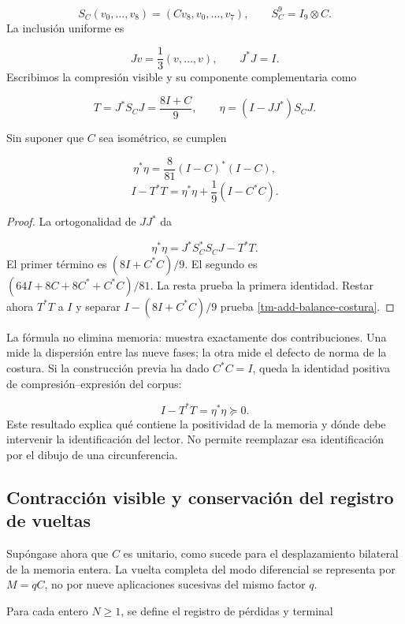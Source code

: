 \[
S_C(v_0,\ldots,v_8)=(Cv_8,v_0,\ldots,v_7),
\qquad S_C^9=I_9\otimes C.
\]
La inclusión uniforme es

\[
Jv=\frac13(v,\ldots,v),\qquad J^*J=I.
\]
Escribimos la compresión visible y su componente complementaria como

\[
T=J^*S_CJ=\frac{8I+C}{9},\qquad
\eta=(I-JJ^*)S_CJ.
\]
\begin{proposition}
\label{tm-add-proposicion-costura-1}
Sin suponer que \(C\) sea isométrico, se cumplen

\[
\eta^*\eta=\frac8{81}(I-C)^*(I-C),
\]
\begin{equation}
\boxed{I-T^*T=\eta^*\eta+\frac19(I-C^*C).}
\label{tm-add-balance-costura}
\end{equation}
\end{proposition}

\begin{proof}
La ortogonalidad de \(JJ^*\) da

\[
\eta^*\eta=J^*S_C^*S_CJ-T^*T.
\]
El primer término es \((8I+C^*C)/9\). El segundo es \((64I+8C+8C^*+C^*C)/81\). La resta prueba la primera identidad. Restar ahora \(T^*T\) a \(I\) y separar \(I-(8I+C^*C)/9\) prueba \eqref{tm-add-balance-costura}.
\end{proof}

La fórmula no elimina memoria: muestra exactamente dos contribuciones. Una mide la dispersión entre las nueve fases; la otra mide el defecto de norma de la costura. Si la construcción previa ha dado \(C^*C=I\), queda la identidad positiva de compresión–expresión del corpus:

\[
I-T^*T=\eta^*\eta\succeq0.
\]
Este resultado explica qué contiene la positividad de la memoria y dónde debe intervenir la identificación del lector. No permite reemplazar esa identificación por el dibujo de una circunferencia.


\subsection{Contracción visible y conservación del registro de vueltas}
\label{tm-add-c3}
Supóngase ahora que \(C\) es unitario, como sucede para el desplazamiento bilateral de la memoria entera. La vuelta completa del modo diferencial se representa por \(M=qC\), no por nueve aplicaciones sucesivas del mismo factor \(q\).

Para cada entero \(N\geq1\), se define el registro de pérdidas y terminal

